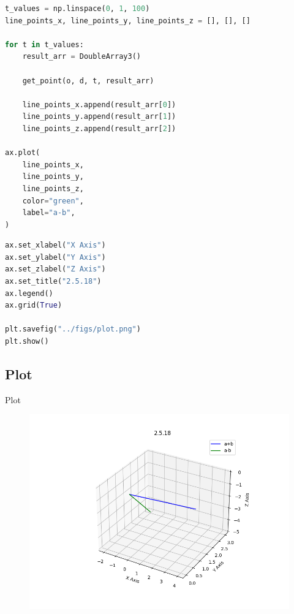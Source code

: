 \documentclass{beamer}
\theoremstyle{remark}
\numberwithin{equation}{section}
\begin{document}
\begin{frame}[fragile]
 \begin{lstlisting}[language=Python]
t_values = np.linspace(0, 1, 100)
line_points_x, line_points_y, line_points_z = [], [], []

for t in t_values:
    result_arr = DoubleArray3()

    get_point(o, d, t, result_arr)

    line_points_x.append(result_arr[0])
    line_points_y.append(result_arr[1])
    line_points_z.append(result_arr[2])

ax.plot(
    line_points_x,
    line_points_y,
    line_points_z,
    color="green",
    label="a-b",
)
 \end{lstlisting}
\end{frame}
\begin{frame}[fragile]
 \begin{lstlisting}[language=Python]
ax.set_xlabel("X Axis")
ax.set_ylabel("Y Axis")
ax.set_zlabel("Z Axis")
ax.set_title("2.5.18")
ax.legend()
ax.grid(True)

plt.savefig("../figs/plot.png")
plt.show()
 \end{lstlisting}
\end{frame}
\subsection{Plot}
\begin{frame}{Plot}
 \begin{figure}[H]
    \centering
    \includegraphics{../figs/plot.png}
    \caption*{}
    \label{fig:plot}
\end{figure}
\end{frame}
\end{document}
